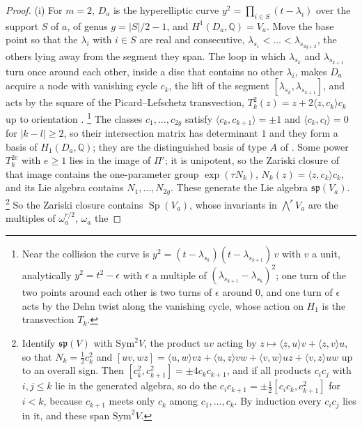 \documentclass[11pt,reqno]{amsart}
\theoremstyle{plain}
\theoremstyle{definition}
\theoremstyle{remark}
\newcommand{\QQ}{\mathbb{Q}}
\DeclareMathOperator{\Sp}{Sp}
\begin{document}
\begin{proof}
(i) For $m=2$, $D_{a}$ is the hyperelliptic curve
$y^{2}=\prod_{i\in S}(t-\lambda_{i})$ over the support $S$ of $a$, of genus
$g=|S|/2-1$, and $H^{1}(D_{a},\QQ)=V_{a}$. Move the base point so that the
$\lambda_{i}$ with $i\in S$ are real and consecutive, $\lambda_{s_{1}}<\dots<
\lambda_{s_{2g+2}}$, the others lying away from the segment they span. The
loop in which $\lambda_{s_{k}}$ and $\lambda_{s_{k+1}}$ turn once around each
other, inside a disc that contains no other $\lambda_{i}$, makes $D_{a}$
acquire a node with vanishing cycle $c_{k}$, the lift of the segment
$[\lambda_{s_{k}},\lambda_{s_{k+1}}]$, and acts by the square of the
Picard--Lefschetz transvection,
$T_{k}^{2}(z)=z+2\langle z,c_{k}\rangle c_{k}$ up to orientation
\cite[Chapter~3]{Voi03}.%
\footnote{Near the collision the curve is $y^{2}=(t-\lambda_{s_{k}})
(t-\lambda_{s_{k+1}})\,v$ with $v$ a unit, analytically $y^{2}=t^{2}-\epsilon$
with $\epsilon$ a multiple of $(\lambda_{s_{k+1}}-\lambda_{s_{k}})^{2}$; one
turn of the two points around each other is two turns of $\epsilon$ around
$0$, and one turn
of $\epsilon$ acts by the Dehn twist along the vanishing cycle, whose action on
$H_{1}$ is the transvection $T_{k}$.} The classes $c_{1},\dots,c_{2g}$ satisfy
$\langle c_{k},c_{k+1}\rangle=\pm1$ and $\langle c_{k},c_{l}\rangle=0$ for
$|k-l|\ge2$, so their intersection matrix has determinant $1$ and they form a
basis of $H_{1}(D_{a},\QQ)$; they are the distinguished basis of type $A$ of
\cite{ACa79}. Some power $T_{k}^{2e}$ with $e\ge1$ lies in the image of
$\Pi'$; it is unipotent, so the Zariski closure of that image contains the
one-parameter group $\exp(\tau N_{k})$, $N_{k}(z)=\langle z,c_{k}\rangle c_{k}$,
and its Lie algebra contains $N_{1},\dots,N_{2g}$. These generate the Lie
algebra $\mathfrak{sp}(V_{a})$.%
\footnote{Identify $\mathfrak{sp}(V)$ with $\mathrm{Sym}^{2}V$, the product $uv$
acting by $z\mapsto\langle z,u\rangle v+\langle z,v\rangle u$, so that
$N_{k}=\tfrac12c_{k}^{2}$ and
$[uv,wz]=\langle u,w\rangle vz+\langle u,z\rangle vw+\langle v,w\rangle uz
+\langle v,z\rangle uw$ up to an overall sign. Then
$[c_{k}^{2},c_{k+1}^{2}]=\pm4c_{k}c_{k+1}$, and if all products
$c_{i}c_{j}$ with $i,j\le k$ lie in the generated algebra, so do the
$c_{i}c_{k+1}=\pm\tfrac12[c_{i}c_{k},c_{k+1}^{2}]$ for $i<k$, because
$c_{k+1}$ meets only $c_{k}$ among $c_{1},\dots,c_{k}$. By induction every
$c_{i}c_{j}$ lies in it, and these span $\mathrm{Sym}^{2}V$.} So the Zariski
closure contains $\Sp(V_{a})$, whose invariants in
$\bigwedge^{r}V_{a}$ are the multiples of $\omega_{a}^{r/2}$, $\omega_{a}$ the

\end{proof}
\end{document}
